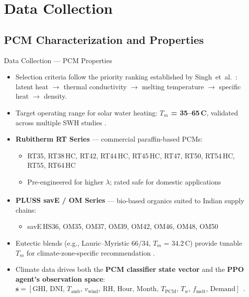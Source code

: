 \documentclass[aspectratio=169, 11pt]{beamer}
\begin{document}
\section{Data Collection}
\subsection{PCM Characterization and Properties}
\begin{frame}{Data Collection --- PCM Properties}
\begin{itemize}

    \item Selection criteria follow the priority ranking established by 
    Singh~et~al.~\cite{Singh2025PCMSWH}: latent heat $\rightarrow$ thermal 
    conductivity $\rightarrow$ melting temperature $\rightarrow$ specific heat 
    $\rightarrow$ density.

    \item Target operating range for solar water heating: \textbf{$T_m$ = 
    35--65\,\textdegree C}, validated across multiple SWH studies 
    \cite{Singh2025PCMSWH, Chen2025TaguchiPCM}.

    \item \textbf{Rubitherm RT Series} \cite{RubithermPCM} --- commercial 
    paraffin-based PCMs:
    \begin{itemize}
        \item RT35, RT38\,HC, RT42, RT44\,HC, RT45\,HC, RT47, RT50, 
              RT54\,HC, RT55, RT64\,HC
        \item Pre-engineered for higher $\lambda$; rated safe for domestic 
              applications
    \end{itemize}

    \item \textbf{PLUSS savE\textsuperscript{\textregistered} / OM Series} 
    \cite{PlussPCM} --- bio-based organics suited to Indian supply chains:
    \begin{itemize}
        \item savE\,HS36, OM35, OM37, OM39, OM42, OM46, OM48, OM50
    \end{itemize}

    \item Eutectic blends (e.g., Lauric--Myristic 66/34, $T_m$ = 34.2\,\textdegree C) 
    provide tunable $T_m$ for climate-zone-specific recommendation 
    \cite{Singh2025PCMSWH}.
    \item Climate data drives both the \textbf{PCM classifier state vector} 
    and the \textbf{PPO agent's observation space}:
    $\mathbf{s} = [\text{GHI, DNI, }T_{\text{amb}}\text{, }
    v_{\text{wind}}\text{, RH, Hour, Month, }
    T_{\text{PCM}}\text{, }T_w\text{, }f_{\text{melt}}\text{, 
    Demand}]$~\cite{Liu2025AIPCM}.
\end{itemize}
\end{frame}
\end{document}
